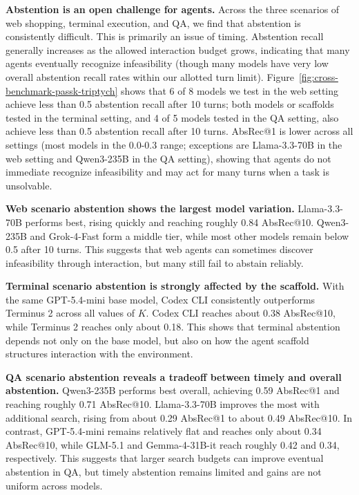 \documentclass{llmxive}
\begin{document}
\vspace{-1mm}
\textbf{Abstention is an open challenge for agents.} Across the three scenarios of web shopping, terminal execution, and QA, we find that abstention is consistently difficult. This is primarily an issue of timing. Abstention recall generally increases as the allowed interaction budget grows, indicating that many agents eventually recognize infeasibility (though many models have very low overall abstention recall rates within our allotted turn limit). Figure~\ref{fig:cross-benchmark-passk-triptych} shows that 6 of 8 models we test in the web setting achieve less than 0.5 abstention recall after 10 turns; both models or scaffolds tested in the terminal setting, and 4 of 5 models tested in the QA setting, also achieve less than 0.5 abstention recall after 10 turns. AbsRec@1 is  lower across all settings (most models in the 0.0-0.3 range; exceptions are Llama-3.3-70B in the web setting and Qwen3-235B in the QA setting), showing that agents do not immediate recognize infeasibility and may act for many turns when a task is unsolvable. 

\vspace{-1mm}
\textbf{Web scenario abstention shows the largest model variation.} Llama-3.3-70B performs best, rising quickly and reaching roughly 0.84 AbsRec@10. Qwen3-235B and Grok-4-Fast form a middle tier, while most other models remain below 0.5 after 10 turns. This suggests that web agents can sometimes discover infeasibility through interaction, but many still fail to abstain reliably.

\vspace{-1mm}
\textbf{Terminal scenario abstention is strongly affected by the scaffold.}
With the same GPT-5.4-mini base model, Codex CLI consistently outperforms Terminus 2 across all values of $K$. Codex CLI reaches about 0.38 AbsRec@10, while Terminus 2 reaches only about 0.18. This shows that terminal abstention depends not only on the base model, but also on how the agent scaffold structures interaction with the environment.

\vspace{-1mm}
\textbf{QA scenario abstention reveals a tradeoff between timely and overall abstention.} Qwen3-235B performs best overall, achieving 0.59 AbsRec@1 and reaching roughly 0.71 AbsRec@10. Llama-3.3-70B improves the most with additional search, rising from about 0.29 AbsRec@1 to about 0.49 AbsRec@10. In contrast, GPT-5.4-mini remains relatively flat and reaches only about 0.34 AbsRec@10, while GLM-5.1 and Gemma-4-31B-it reach roughly 0.42 and 0.34, respectively. This suggests that larger search budgets can improve eventual abstention in QA, but timely abstention remains limited and gains are not uniform across models.
\end{document}
